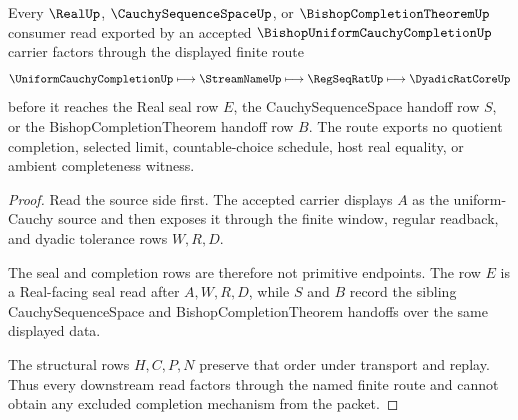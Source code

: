 \begin{theorem}
\label{thm:bishop-uniform-cauchy-completion-real-seal-handoff}
Every $\RealUp$, $\CauchySequenceSpaceUp$, or $\BishopCompletionTheoremUp$ consumer read exported by an accepted $\BishopUniformCauchyCompletionUp$ carrier factors through the displayed finite route
$$
\UniformCauchyCompletionUp \longmapsto \StreamNameUp \longmapsto \RegSeqRatUp \longmapsto \DyadicRatCoreUp
$$
before it reaches the Real seal row $E$, the CauchySequenceSpace handoff row $S$, or the BishopCompletionTheorem handoff row $B$. The route exports no quotient completion, selected limit, countable-choice schedule, host real equality, or ambient completeness witness.
\end{theorem}
\begin{proof}
Read the source side first. The accepted carrier displays $A$ as the uniform-Cauchy source and then exposes it through the finite window, regular readback, and dyadic tolerance rows $W,R,D$.

The seal and completion rows are therefore not primitive endpoints. The row $E$ is a Real-facing seal read after $A,W,R,D$, while $S$ and $B$ record the sibling CauchySequenceSpace and BishopCompletionTheorem handoffs over the same displayed data.

The structural rows $H,C,P,N$ preserve that order under transport and replay. Thus every downstream read factors through the named finite route and cannot obtain any excluded completion mechanism from the packet.
\end{proof}




